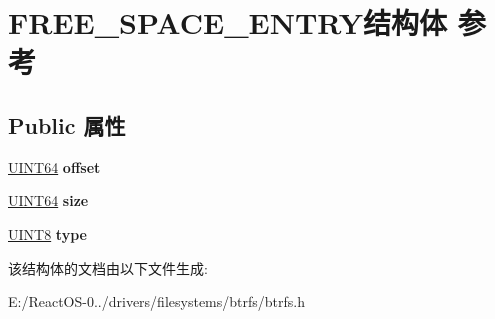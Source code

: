 \hypertarget{struct_f_r_e_e___s_p_a_c_e___e_n_t_r_y}{}\section{F\+R\+E\+E\+\_\+\+S\+P\+A\+C\+E\+\_\+\+E\+N\+T\+R\+Y结构体 参考}
\label{struct_f_r_e_e___s_p_a_c_e___e_n_t_r_y}
\subsection*{Public 属性}
\begin{DoxyCompactItemize}
\item 
\mbox{\label{struct_f_r_e_e___s_p_a_c_e___e_n_t_r_y_a76c3ebf8ff1bba8a5e5220e4527187b9}} 
\hyperlink{_processor_bind_8h_a57be03562867144161c1bfee95ca8f7c}{U\+I\+N\+T64} {\bfseries offset}
\item 
\mbox{\label{struct_f_r_e_e___s_p_a_c_e___e_n_t_r_y_acf2205c929b21ee3d38f0f41d185e90b}} 
\hyperlink{_processor_bind_8h_a57be03562867144161c1bfee95ca8f7c}{U\+I\+N\+T64} {\bfseries size}
\item 
\mbox{\label{struct_f_r_e_e___s_p_a_c_e___e_n_t_r_y_a6a28024423e797311d6abb592d669b49}} 
\hyperlink{_processor_bind_8h_ab27e9918b538ce9d8ca692479b375b6a}{U\+I\+N\+T8} {\bfseries type}
\end{DoxyCompactItemize}


该结构体的文档由以下文件生成\+:\begin{DoxyCompactItemize}
\item 
E\+:/\+React\+O\+S-\/0../drivers/filesystems/btrfs/btrfs.\+h\end{DoxyCompactItemize}
